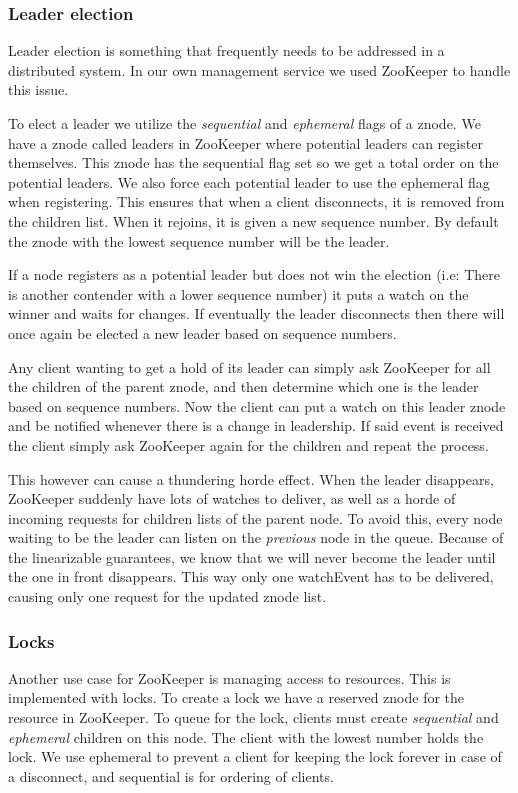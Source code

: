 \subsubsection{Leader election}
Leader election is something that frequently needs to be addressed in a distributed system. In our own management service we used ZooKeeper to handle this issue. 

To elect a leader we utilize the \emph{sequential} and \emph{ephemeral} flags of a znode. We have a znode called leaders in ZooKeeper where potential leaders can register themselves. This znode has the sequential flag set so we get a total order on the potential leaders. We also force each potential leader to use the ephemeral flag when registering. This ensures that when a client disconnects, it is removed from the children list. When it rejoins, it is given a new sequence number. By default the znode with the lowest sequence number will be the leader.

If a node registers as a potential leader but does not win the election (i.e: There is another contender with a lower sequence number) it puts a watch on the winner and waits for changes. If eventually the leader disconnects then there will once again be elected a new leader based on sequence numbers.

Any client wanting to get a hold of its leader can simply ask ZooKeeper for all the children of the parent znode, and then determine which one is the leader based on sequence numbers. Now the client can put a watch on this leader znode and be notified whenever there is a change in leadership. If said event is received the client simply ask ZooKeeper again for the children and repeat the process. 

This however can cause a thundering horde effect. When the leader disappears, ZooKeeper suddenly have lots of watches to deliver, as well as a horde of incoming requests for children lists of the parent node. To avoid this, every node waiting to be the leader can listen on the \emph{previous} node in the queue. Because of the linearizable guarantees, we know that we will never become the leader until the one in front disappears. This way only one watchEvent has to be delivered, causing only one request for the updated znode list.

\subsubsection{Locks}
Another use case for ZooKeeper is managing access to resources. This is implemented with locks. To create a lock we have a reserved znode for the resource in ZooKeeper. To queue for the lock, clients must create \emph{sequential} and \emph{ephemeral} children on this node. The client with the lowest number holds the lock. We use ephemeral to prevent a client for keeping the lock forever in case of a disconnect, and sequential is for ordering of clients.

